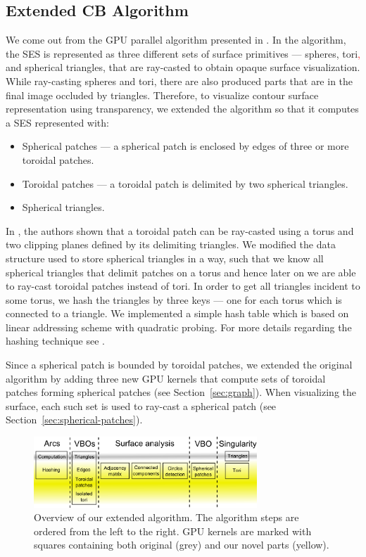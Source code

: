 \subsection{Extended CB Algorithm}

We come out from the GPU parallel algorithm presented in \cite{krone2011parallel}.
In the algorithm, the SES is represented as three different sets of surface primitives --- spheres, tori\textcolor{red}{,} and spherical triangles, that are ray-casted to obtain opaque surface visualization.
While ray-casting spheres and tori, there are also produced parts that are in the final image occluded by triangles.
Therefore, to visualize contour surface representation using transparency, we extended the algorithm so that it computes a SES represented with:
\begin{itemize}
  \item Spherical patches --- a spherical patch is enclosed by edges of three or more toroidal patches.
	\item Toroidal patches --- a toroidal patch is delimited by two spherical triangles.
	\item Spherical triangles.
\end{itemize}

In \cite{kauker2013rendering}, the authors shown that a toroidal patch can be ray-casted using a torus and two clipping planes defined by its delimiting triangles.
We modified the data structure used to store spherical triangles in a way, such that we know all spherical triangles that delimit patches on a torus and hence later on we are able to ray-cast toroidal patches instead of tori.
In order to get all triangles incident to some torus, we hash the triangles by three keys --- one for each torus which is connected to a triangle.
We implemented a simple hash table which is based on linear addressing scheme with quadratic probing.
For more details regarding the hashing technique see \cite{alcantara2011efficient}.

Since a spherical patch is bounded by toroidal patches, we extended the original algorithm by adding three new GPU kernels that compute sets of toroidal patches forming spherical patches (see Section~\ref{sec:graph}). When visualizing the surface, each such set is used to ray-cast a spherical patch (see Section~\ref{sec:spherical-patches}).

\begin{figure}[htb]
  \centering
  \includegraphics[width=3.3in]{image/kernels.png}
  \caption{Overview of our extended algorithm.
	The algorithm steps are ordered from the left to the right.
	GPU kernels are marked with squares containing both original (grey) and our novel parts (yellow).}
	\label{fig:kernels}
\end{figure}

